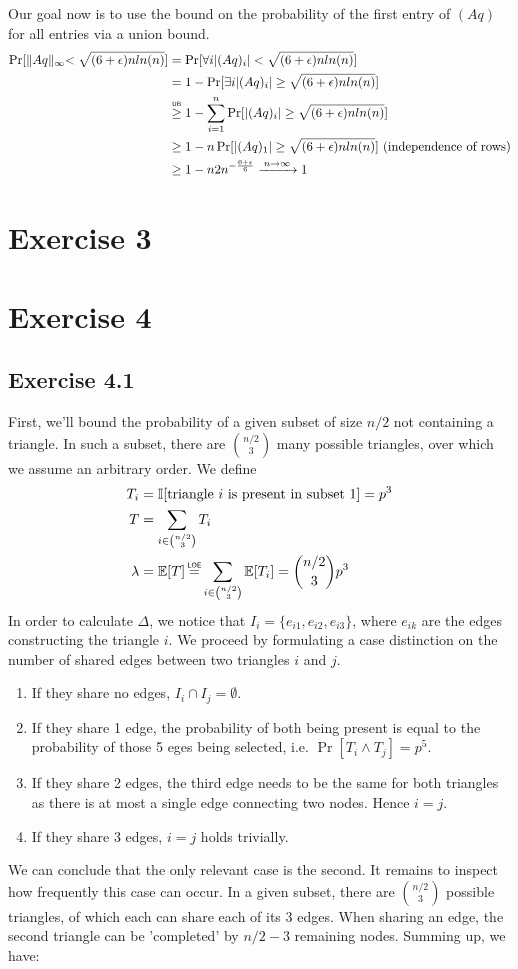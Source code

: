 \documentclass[a4paper,german]{article}
\newcommand\loe{\mathrel{\overset{\makebox[0pt]{\mbox{\normalfont\tiny\sffamily LOE}}}{=}}}
\newcommand\gequb{\mathrel{\overset{\makebox[0pt]{\mbox{\normalfont\tiny\sffamily UB}}}{\geq}}}
\newcommand{\E}{\mathbb{E}}
\begin{document}
Our goal now is to use the bound on the probability of the first entry of \( (Aq) \) for all entries via a union bound.
\begin{align*}
\Pr[ \lVert Aq \lVert_{\infty} < \sqrt {(6+\epsilon)nln(n)}] &= \Pr[ \forall i  |(Aq)_i|  < \sqrt {(6+\epsilon)nln(n)}] \\
&= 1 - \Pr[ \exists i  |(Aq)_i|  \geq \sqrt {(6+\epsilon)nln(n)}] \\
&\gequb 1 - \sum_{i=1}^n \Pr[|(Aq)_i|  \geq \sqrt {(6+\epsilon)nln(n)}] \\
&\geq 1 - n \Pr[|(Aq)_1|  \geq \sqrt {(6+\epsilon)nln(n)}] \text{     (independence of rows)}\\
&\geq 1 - n 2 n^{-\frac{6+\epsilon}{6}}  \xrightarrow{\: n \to \infty \: } 1
\end{align*}
\section*{Exercise 3}
\section*{Exercise 4}
\subsection*{Exercise 4.1}
First, we'll bound the probability of a given subset of size \(n/2\) not containing a triangle. In such a subset, there are \( {n/2 \choose 3}\) many possible triangles, over which we assume an arbitrary order. We define 
\begin{align*} 
T_i &= \mathbb{I} [\text{triangle } i \text{ is present in subset } 1] = p^3 \\
T &= \sum_{i \in {n/2 \choose 3}} T_i \\
\lambda &= \E[T] \loe \sum_{i \in {n/2 \choose 3}} \E[T_i] = {n/2 \choose 3} p^3
\end{align*}
In order to calculate \(\Delta\), we notice that \(I_i = \{e_{i1}, e_{i2}, e_{i3} \}\), where \(e_{ik}\) are the edges constructing the triangle \(i\). We proceed by formulating a case distinction on the number of shared edges between two triangles \(i\) and \(j\).
\begin{enumerate}
\item If  they share no edges, \(I_i \cap I_j = \emptyset \).
\item If they share 1 edge, the probability of both being present is equal to the probability of those 5 eges being selected, i.e. \(\Pr[T_i \wedge T_j] = p^5\).
\item If they share 2 edges, the third edge needs to be the same for both triangles as there is at most a single edge connecting two nodes. Hence \(i = j\).
\item If they share 3 edges, \(i = j\) holds trivially. 
\end{enumerate}
We can conclude that the only relevant case is the second. It remains to inspect how frequently this case can occur. In a given subset, there are \( {n/2 \choose 3} \) possible triangles, of which each can share each of its 3 edges. When sharing an edge, the second triangle can be 'completed' by \(n/2 -3\) remaining nodes. Summing up, we have:
\end{document}
